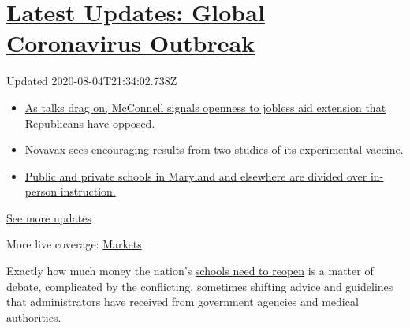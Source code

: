 \hypertarget{latest-updates-global-coronavirus-outbreak}{%
\section{\texorpdfstring{\href{https://www.nytimes3xbfgragh.onion/2020/08/04/world/coronavirus-cases.html?action=click\&pgtype=Article\&state=default\&region=MAIN_CONTENT_1\&context=storylines_live_updates}{Latest
Updates: Global Coronavirus
Outbreak}}{Latest Updates: Global Coronavirus Outbreak}}\label{latest-updates-global-coronavirus-outbreak}}

Updated 2020-08-04T21:34:02.738Z

\begin{itemize}
\tightlist
\item
  \href{https://www.nytimes3xbfgragh.onion/2020/08/04/world/coronavirus-cases.html?action=click\&pgtype=Article\&state=default\&region=MAIN_CONTENT_1\&context=storylines_live_updates\#link-2daa96b5}{As
  talks drag on, McConnell signals openness to jobless aid extension
  that Republicans have opposed.}
\item
  \href{https://www.nytimes3xbfgragh.onion/2020/08/04/world/coronavirus-cases.html?action=click\&pgtype=Article\&state=default\&region=MAIN_CONTENT_1\&context=storylines_live_updates\#link-1228a480}{Novavax
  sees encouraging results from two studies of its experimental
  vaccine.}
\item
  \href{https://www.nytimes3xbfgragh.onion/2020/08/04/world/coronavirus-cases.html?action=click\&pgtype=Article\&state=default\&region=MAIN_CONTENT_1\&context=storylines_live_updates\#link-4825b93}{Public
  and private schools in Maryland and elsewhere are divided over
  in-person instruction.}
\end{itemize}

\href{https://www.nytimes3xbfgragh.onion/2020/08/04/world/coronavirus-cases.html?action=click\&pgtype=Article\&state=default\&region=MAIN_CONTENT_1\&context=storylines_live_updates}{See
more updates}

More live coverage:
\href{https://www.nytimes3xbfgragh.onion/live/2020/08/04/business/stock-market-today-coronavirus?action=click\&pgtype=Article\&state=default\&region=MAIN_CONTENT_1\&context=storylines_live_updates}{Markets}

Exactly how much money the nation's
\href{https://www.nytimes3xbfgragh.onion/2020/07/16/upshot/coronavirus-school-reopening-private-public-gap.html}{schools
need to reopen} is a matter of debate, complicated by the conflicting,
sometimes shifting advice and guidelines that administrators have
received from government agencies and medical authorities.

